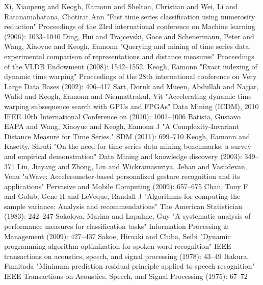 \begin{thebibliography}{1} 
     Xi, Xiaopeng and Keogh, Eamonn and Shelton, Christian and Wei, Li and Ratanamahatana, Chotirat
    Ann "Fast time series classification using numerosity reduction" Proceedings of the 23rd international conference on
    Machine learning (2006): 1033--1040
     Ding, Hui and Trajcevski, Goce and Scheuermann, Peter and Wang, Xiaoyue and Keogh, Eamonn
    "Querying and mining of time series data: experimental comparison of representations and distance measures"
    Proceedings of the VLDB Endowment (2008): 1542--1552.
     Keogh, Eamonn "Exact indexing of dynamic time warping" Proceedings of the 28th
    international conference on Very Large Data Bases (2002): 406--417
     Sart, Doruk and Mueen, Abdullah and Najjar, Walid and Keogh, Eamonn and
    Niennattrakul, Vit "Accelerating dynamic time warping subsequence search with GPUs and FPGAs" Data Mining (ICDM),
    2010 IEEE 10th International Conference on (2010): 1001--1006
     Batista, Gustavo EAPA and Wang, Xiaoyue and Keogh, Eamonn J "A
    Complexity-Invariant Distance Measure for Time Series." SDM (2011): 699--710
     Keogh, Eamonn and Kasetty, Shruti "On the need for time series data mining benchmarks: a
    survey and empirical demonstration" Data Mining and knowledge discovery (2003): 349--371
     Liu, Jiayang and Zhong, Lin and Wickramasuriya, Jehan and Vasudevan, Venu "uWave:
    Accelerometer-based personalized gesture recognition and its applications" Pervasive and Mobile Computing
    (2009): 657--675
     Chan, Tony F and Golub, Gene H and LeVeque, Randall J "Algorithms for computing the
    sample variance: Analysis and recommendations" The American Statistician (1983): 242--247
     Sokolova, Marina and Lapalme, Guy "A systematic analysis of performance measures
    for classification tasks" Information Processing \& Management (2009): 427--437
     Sakoe, Hiroaki and Chiba, Seibi "Dynamic programming algorithm optimization for spoken
    word recognition" IEEE transactions on acoustics, speech, and signal processing (1978): 43--49
     Itakura, Fumitada "Minimum prediction residual principle applied to speech recognition"
    IEEE Transactions on Acoustics, Speech, and Signal Processing (1975): 67--72
\end{thebibliography}
